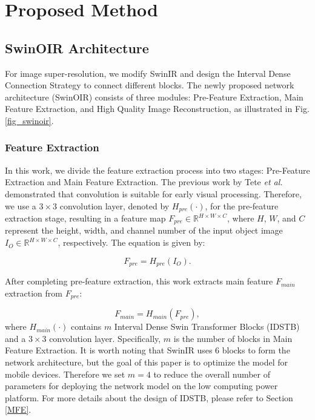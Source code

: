 \documentclass[default,iicol]{sn-jnl}
\theoremstyle{thmstyleone}\newtheorem{theorem}{Theorem}\newtheorem{proposition}[theorem]{Proposition}
\theoremstyle{thmstyletwo}\newtheorem{example}{Example}\newtheorem{remark}{Remark}\theoremstyle{thmstylethree}\newtheorem{definition}{Definition}
\begin{document}
\section{Proposed Method}
\label{method}
\subsection{SwinOIR Architecture}
For image super-resolution, we modify SwinIR \cite{liang2021swinir} and design the Interval Dense Connection Strategy to connect different blocks. The newly proposed network architecture (SwinOIR) consists of three modules: Pre-Feature Extraction, Main Feature Extraction, and High Quality Image Reconstruction, as illustrated in Fig. \ref{fig_swinoir}.

\subsubsection{Feature Extraction}
In this work, we divide the feature extraction process into two stages: Pre-Feature Extraction and Main Feature Extraction. The previous work by Tete \emph{et al.} \cite{xiao2021early} demonstrated that convolution is suitable for early visual processing. Therefore, we use a $3\times 3$ convolution layer, denoted by $H_{\textit{pre}}(\cdot)$, for the pre-feature extraction stage, resulting in a feature map $F_{pre}\in\mathbb{R}^{H\times W\times C}$, where $H$, $W$, and $C$ represent the height, width, and channel number of the input object image $I_{\textit{O}}\in\mathbb{R}^{H\times W\times C}$, respectively. The equation is given by:

\begin{equation}
F_{pre}=H_{\textit{pre}}(I_{\textit{O}}).
\end{equation} 

After completing pre-feature extraction, this work extracts main feature $F_{\textit{main}}$ extraction from $F_{\textit{pre}}$:

\begin{equation}
F_{\textit{main}}=H_{\textit{main}}(F_{pre}),
\end{equation} 
where $H_{\textit{main}}(\cdot)$ contains $m$ Interval Dense Swin Transformer Blocks (IDSTB) and a $3 \times 3$ convolution layer. Specifically, $m$ is the number of blocks in Main Feature Extraction. It is worth noting that SwinIR \cite{liang2021swinir} uses 6 blocks to form the network architecture, but the goal of this paper is to optimize the model for mobile devices. Therefore we set $m=4$ to reduce the overall number of parameters for deploying the network model on the low computing power platform. For more details about the design of IDSTB, please refer to Section \ref{MFE}.
\end{document}
